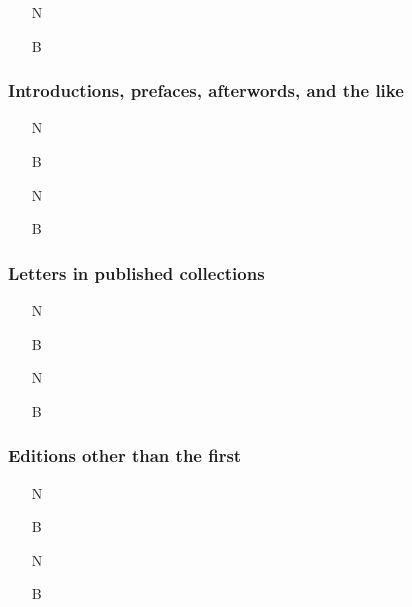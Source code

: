 \documentclass[11pt,letterpaper,oneside]{article}
\begin{document}
\begin{itemize}
\item[N] 

\item[B] 
\end{itemize}

\setcounter{subsubsection}{115}
\subsubsection{Introductions, prefaces, afterwords, and the like}

\begin{itemize}
\item[N] 

\item[B] 

\item[N] 

\item[B] 
\end{itemize}

\subsubsection{Letters in published collections}

\begin{itemize}
\item[N] 

\item[B] 

\item[N] 

\item[B] 
\end{itemize}

\setcounter{subsubsection}{117}
\subsubsection{Editions other than the first}

\begin{itemize}
\item[N] 

\item[B] 

\item[N] 

\item[B] 
\end{itemize}
\end{document}
